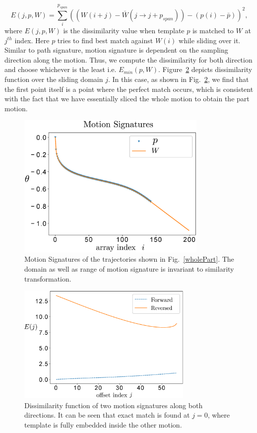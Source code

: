 \documentclass[twocolumn,10pt]{asme2ej}
\begin{document}
\begin{equation}\label{mccEq}
  E(j, p, W) = \sum_{i}^{p_{span}} {((W(i+j) - \bar{W}(j\to j + p_{span})) - (p(i) - \bar{p}))}^2,
\end{equation}
where $E(j, p, W)$ is the dissimilarity value when template $p$ is matched to $W$ at $j^{th}$ index. Here $p$ tries to find best match against $W(i)$ while sliding over it.
Similar to path signature, motion signature is dependent on the sampling direction along the motion. Thus, we compute the dissimilarity for both direction and choose whichever is the least i.e. $E_{min}(p, W)$.
Figure~\ref{mcc} depicts dissimilarity function over the sliding domain $j$.
In this case, as shown in Fig.~\ref{mcc}, we find that the first point itself is a point where the perfect match occurs, which is consistent with the fact that we have essentially sliced the whole motion to obtain the part motion.

\begin{figure}
\centering
\includegraphics[width=260pt]{figure/fig_motion_signatures.eps}
  \caption{Motion Signatures of the trajectories shown in Fig.~\ref{wholePart}. The domain as well as range of motion signature is invariant to similarity transformation.}
\label{motionSignature}
\end{figure}

\begin{figure}
\centering
\includegraphics[width=240pt]{figure/fig_mcc.eps}
  \caption{Dissimilarity function of two motion signatures along both directions. It can be seen that exact match is found at $j=0$, where template is fully embedded inside the other motion.}
\label{mcc}
\end{figure}
\end{document}
